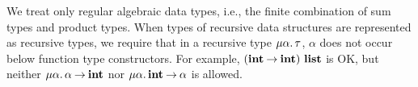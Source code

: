 We treat only regular algebraic data types, i.e., the finite combination of sum
types and product types.  When types of recursive data structures are
represented as recursive types, we require that in a recursive type
$\mu{\alpha}.\, {\tau}$, $\alpha$ does not occur below function type
constructors. For example, ${({\mathbf{int}}\mathbin{\rightarrow}{\mathbf{int}})}\ \mathbf{list}$ is OK, but
neither $\mu{\alpha}.\, {{\alpha}\mathbin{\rightarrow}{\mathbf{int}}}$ nor
$\mu{\alpha}.\, {{\mathbf{int}}\mathbin{\rightarrow}{\alpha}}$ is allowed.


%
%
%
%
